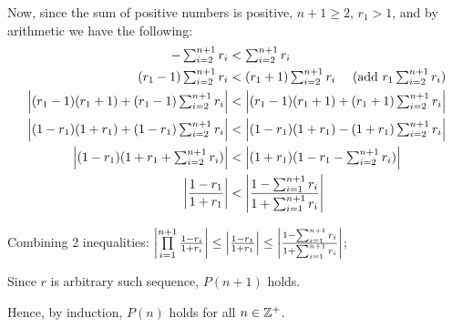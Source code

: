 \documentclass[11pt]{alittlebear}
\begin{document}
{{{{{{                    Now, since the sum of positive numbers is positive, $n+1\geq2$, $r_1>1$, and by arithmetic we have the following:
                    \begin{align*}
                        -\textstyle\sum_{i=2}^{n+1}r_i&<\textstyle\sum_{i=2}^{n+1}r_i\\
                        (r_1-1)\textstyle\sum_{i=2}^{n+1}r_i &< (r_1+1)\textstyle\sum_{i=2}^{n+1}r_i \text{ \quad(add $r_1\textstyle\sum_{i=2}^{n+1}r_i$)}\\
                        \left|(r_1-1)(r_1+1)+(r_1-1)\textstyle\sum_{i=2}^{n+1}r_i\right| &< \left|(r_1-1)(r_1+1)+(r_1+1)\textstyle\sum_{i=2}^{n+1}r_i\right|\\
                        \left|(1-r_1)(1+r_1)+(1-r_1)\textstyle\sum_{i=2}^{n+1}r_i\right|&<\left|(1-r_1)(1+r_1)-(1+r_1)\textstyle\sum_{i=2}^{n+1}r_i\right|\\
                        \left|(1-r_1)(1+r_1+\textstyle\sum_{i=2}^{n+1}r_i)\right|&<\left|(1+r_1)(1-r_1-\textstyle\sum_{i=2}^{n+1}r_i)\right|\\
                        \left|\frac{1-r_1}{1+r_1}\right|&<\left|\frac{1-\sum_{i=1}^{n+1}r_i}{1+\sum_{i=1}^{n+1}r_i}\right|
                    \end{align*}

                    Combining 2 inequalities: $\left|\prod\limits_{i=1}^{n+1} \frac{1-r_i}{1+r_i}\right| \leq \left|\frac{1-r_1}{1+r_1}\right| \leq \left|\frac{1-\sum_{i=1}^{n+1}r_i}{1+\sum_{i=1}^{n+1}r_i}\right|$;
                }
                Since $r$ is arbitrary such sequence, $P(n+1)$ holds.
            }
        }
        Hence, by induction, $P(n)$ holds for all $n\in\mathbb{Z}^+$.
        }
    }

    }
\end{document}
